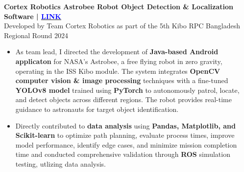 \noindent
{\noindent\fontsize{12pt}{15pt}\bfseries Cortex Robotics Astrobee Robot Object Detection \& Localization Software | \href{https://www.linkedin.com/posts/humam-hossain-7ab762230_we-are-delighted-to-announce-that-cortex-activity-7216897808526630913-fK7n?utm_source=share&utm_medium=member_desktop&rcm=ACoAADnGy_MBOD27r03GQ-w_ksuO4sb1-cAV6_A}{\underline{\textcolor{blue}{LINK}}}} \\
{\fontsize{9pt}{11pt}Developed by Team Cortex Robotics as part of the 5th Kibo RPC Bangladesh Regional Round 2024}
\begin{itemize}
    \item As team lead, I directed the development of \textbf{Java-based Android applicaton} for NASA's Astrobee, a free flying robot in zero gravity, operating in the ISS Kibo module. The system integrates \textbf{OpenCV computer vision \& image processing} techniques with a fine-tuned \textbf{YOLOv8 model} trained using \textbf{PyTorch} to autonomously patrol, locate, and detect objects across different regions. The robot provides real-time guidance to astronauts for target object identification. 
    
    \item Directly contributed to \textbf{data analysis} using \textbf{Pandas, Matplotlib, and Scikit-learn} to optimize path planning, evaluate process times, improve model performance, identify edge cases, and minimize mission completion time and conducted comprehensive validation through \textbf{ROS} simulation testing, utlizing data analysis.
\end{itemize}